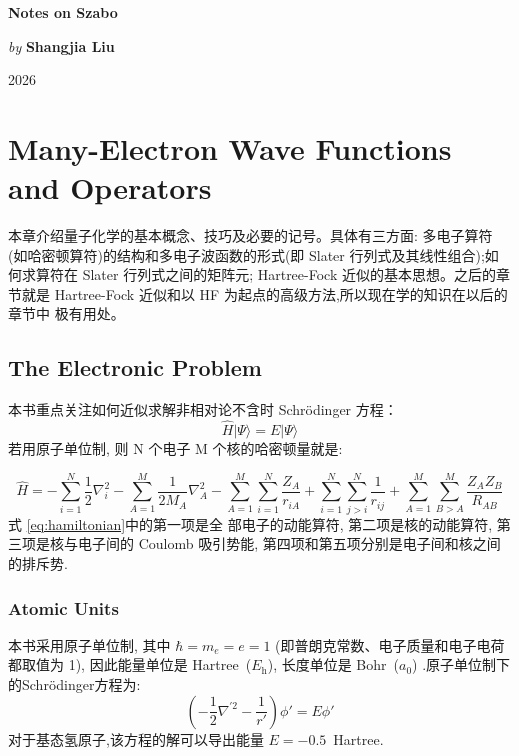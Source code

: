 \documentclass[fontset=none,12pt,a4paper]{ctexart}
\numberwithin{equation}{section}
\begin{document}
\begin{center}
\thispagestyle{empty}

\vspace{2.5cm}
{\fontsize{44}{48}\bfseries\selectfont Notes on Szabo}

\vfill
\begin{center}
\Large  \textit{by} \textbf{Shangjia Liu} 
\end{center} 
{\Large 2026}
\vspace{1.75cm}
\end{center}

\newpage
{}  
\setcounter{page}{2}  
\tableofcontents

\newpage
{}
\setcounter{page}{1}
\section{Many-Electron Wave Functions and Operators}
{本章介绍量子化学的基本概念、技巧及必要的记号。具体有三方面:
多电子算符 (如哈密顿算符)的结构和多电子波函数的形式(即 Slater 
行列式及其线性组合);如 何求算符在 Slater 行列式之间的矩阵元;
Hartree-Fock 近似的基本思想。之后的章节就是 Hartree-Fock 
近似和以 HF 为起点的高级方法,所以现在学的知识在以后的章节中
极有用处。}


\subsection{The Electronic Problem}
本书重点关注如何近似求解非相对论不含时 Schrödinger 方程：
\begin{equation}
  \hat{H} |\Psi\rangle = E |\Psi\rangle
  \label{eq:schrodinger}
\end{equation}
若用原子单位制, 则 N 个电子 M 个核的哈密顿量就是:

\begin{equation}
  \hat{H}=-\sum_{i=1}^N\frac{1}{2}\nabla_i^2-
  \sum_{A=1}^{M}\frac{1}{2M_A}\nabla_A^2-
  \sum_{A=1}^{M}\sum_{i=1}^N\frac{Z_A}{r_{iA}}+
  \sum_{i=1}^{N}\sum_{j>i}^N\frac{1}{r_{ij}}+
  \sum_{A=1}^M\sum_{B>A}^M\frac{Z_AZ_B}{R_{AB}} 
  \label{eq:hamiltonian}
\end{equation}
式 \eqref{eq:hamiltonian}中的第一项是全 部电子的动能算符,
 第二项是核的动能算符, 第三项是核与电子间的 Coulomb 吸引势能,
第四项和第五项分别是电子间和核之间的排斥势.

\subsubsection{Atomic Units}
本书采用原子单位制, 其中  \(\hbar = m_e = e = 1\)
(即普朗克常数、电子质量和电子电荷都取值为 1),
因此能量单位是 Hartree~($E_{\mathrm{h}}$), 长度单位是 Bohr~($a_0$)
.原子单位制下的Schrödinger方程为:
\begin{equation}
  \left( -\frac{1}{2} \nabla^{\prime 2} - \frac{1}{r'} \right) \phi' = E \phi'
  \label{eq:schrodinger-atomic}
\end{equation}
对于基态氢原子,该方程的解可以导出能量 $E = -0.5$~Hartree.
\end{document}
